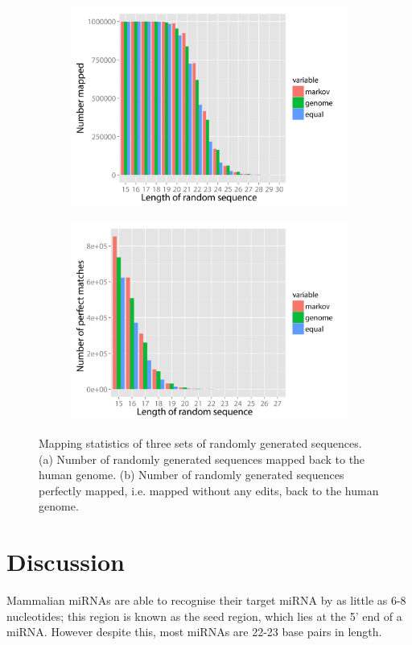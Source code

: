 \documentclass{article}
\begin{document}
\begin{figure}
   \centering
   \begin{subfigure}{.5\textwidth}
      \centering
      \includegraphics[width=\textwidth,natwidth=2345,natheight=1692]{mapped.png}
      \caption{}
      \label{fig:mapped}
   \end{subfigure}%
      \begin{subfigure}{.5\textwidth}
      \centering
      \includegraphics[width=\textwidth,natwidth=2345,natheight=1692]{perfectly_mapped.png}
      \caption{}
      \label{fig:perfect_mapped}
   \end{subfigure}
   \caption{Mapping statistics of three sets of randomly generated sequences. (a) Number of randomly generated sequences mapped back to the human genome. (b) Number of randomly generated sequences perfectly mapped, i.e. mapped without any edits, back to the human genome.}
   \label{fig:mapping}
\end{figure}

\section{Discussion}\label{discussion}

Mammalian miRNAs are able to recognise their target miRNA by as little as 6-8 nucleotides; this region is known as the seed region, which lies at the 5' end of a miRNA. However despite this, most miRNAs are 22-23 base pairs in length.



\end{document}
